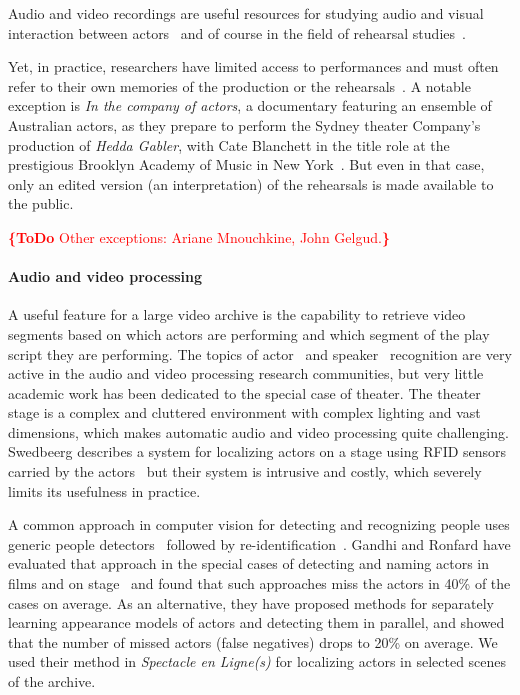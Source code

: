 \documentclass[conference]{IEEEtran}
\newcommand{\todo}[1]{\noindent\textcolor{red}{{\bf \{ToDo} #1{\bf \}}}}
\begin{document}
Audio and video recordings are useful resources for studying audio and visual interaction between actors~\cite{Fitzpatrick90}
and of course in the field of rehearsal studies~\cite{McAuley98a,McAuley98b,McAuley06,McAuley08}.

Yet, in practice, researchers have limited access to performances and must often refer to their own memories of the production or the rehearsals~\cite{Selbourne82,Sher85,Stafford00,Stern00}. A notable exception is {\em In the company of actors}, a documentary featuring an ensemble of Australian actors, as they prepare to perform the Sydney theater Company's production of \emph{Hedda Gabler}, with Cate Blanchett in the title role at the prestigious Brooklyn Academy of Music  in New York~\cite{Darling07}. But even in that case, only an edited version (an interpretation)  of the rehearsals is made available to the public. 

\todo{Other exceptions: Ariane Mnouchkine, John Gelgud.}

\paragraph*{Audio and video processing}
A useful feature for a large video archive is the capability to retrieve video segments based on which actors 
are performing and which segment of the play script they are performing. The topics of actor~\cite{Hilton06} and speaker~\cite{Miro12} recognition are very active in the audio and video processing research communities, but very little academic 
work has been dedicated to the special case of theater. The theater stage is a complex and cluttered environment 
with complex lighting and vast dimensions, which makes automatic audio and video processing quite challenging. 
Swedbeerg describes a system for localizing actors on a stage using RFID sensors carried by the actors~\cite{Swedberg}
but their system is intrusive and costly, which severely limits its usefulness in practice.

A common approach in computer vision for detecting and recognizing people uses generic people detectors~\cite{Ronfard02,
Dalal05,Felzenszwalb10,Andriluka12} followed by re-identification~\cite{TapaswiBS12}. Gandhi and Ronfard have evaluated 
that approach in the special cases of detecting and naming actors in films and on stage~\cite{Gandhi13} and found that such 
approaches miss the actors in 40\% of the cases on average. As an alternative, they have proposed
methods for separately learning appearance models of actors and detecting them in parallel, and showed that the number
of missed actors (false negatives) drops to 20\% on average. We used their method in \emph{Spectacle en Ligne(s)} for localizing
actors in selected scenes of the archive.
\end{document}
